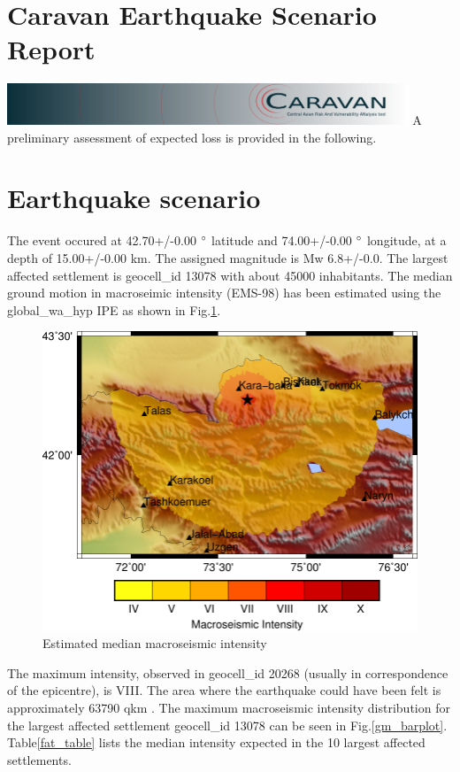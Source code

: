 \documentclass{article}
\begin{document}
\section*{Caravan Earthquake Scenario Report}
\includegraphics[width=12cm]{../imgs/banner0.png}
A preliminary assessment of expected loss is provided in the following.
\section*{Earthquake scenario}
The event occured at 42.70+/{-}0.00 $\degree$ latitude 
and 74.00+/{-}0.00 $\degree$ longitude, 
at a depth of 15.00+/{-}0.00 km. 
The assigned magnitude is Mw 6.8+/{-}0.0. 
The largest affected settlement is geocell\_id 13078 with about 45000 inhabitants. The median ground motion in macroseimic intensity (EMS{-}98) has been estimated using the global\_wa\_hyp IPE as shown in Fig.\ref{gm_fig}.


\begin{figure}[h!]
\centering
\includegraphics[width=12cm]{gm.pdf}
\caption{Estimated median macroseismic intensity}
\label{gm_fig}
\end{figure}


The maximum intensity, observed in geocell\_id 20268 (usually in correspondence of the epicentre), is VIII. The area where the earthquake could have been felt is approximately 63790 qkm .
The maximum macroseismic intensity distribution for the largest affected settlement geocell\_id 13078 can be seen in Fig.\ref{gm_barplot}. 
Table\ref{fat_table} lists the median intensity expected in the 10 largest affected settlements.
\end{document}
